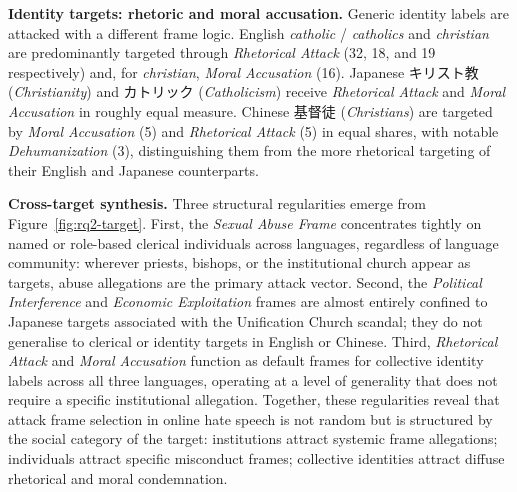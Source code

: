 \documentclass[../CLthesis.tex]{subfiles}
\begin{document}
\textbf{Identity targets: rhetoric and moral accusation.}
Generic identity labels are attacked with a different frame logic. English \textit{catholic} / \textit{catholics} and \textit{christian} are predominantly targeted through \textit{Rhetorical Attack} (32, 18, and 19 respectively) and, for \textit{christian}, \textit{Moral Accusation} (16). Japanese キリスト教 (\textit{Christianity}) and カトリック (\textit{Catholicism}) receive \textit{Rhetorical Attack} and \textit{Moral Accusation} in roughly equal measure. Chinese 基督徒 (\textit{Christians}) are targeted by \textit{Moral Accusation} (5) and \textit{Rhetorical Attack} (5) in equal shares, with notable \textit{Dehumanization} (3), distinguishing them from the more rhetorical targeting of their English and Japanese counterparts.

\textbf{Cross-target synthesis.}
Three structural regularities emerge from Figure~\ref{fig:rq2-target}. First, the \textit{Sexual Abuse Frame} concentrates tightly on named or role-based clerical individuals across languages, regardless of language community: wherever priests, bishops, or the institutional church appear as targets, abuse allegations are the primary attack vector. Second, the \textit{Political Interference} and \textit{Economic Exploitation} frames are almost entirely confined to Japanese targets associated with the Unification Church scandal; they do not generalise to clerical or identity targets in English or Chinese. Third, \textit{Rhetorical Attack} and \textit{Moral Accusation} function as default frames for collective identity labels across all three languages, operating at a level of generality that does not require a specific institutional allegation. Together, these regularities reveal that attack frame selection in online hate speech is not random but is structured by the social category of the target: institutions attract systemic frame allegations; individuals attract specific misconduct frames; collective identities attract diffuse rhetorical and moral condemnation.

\subfilebibliography
\end{document}
